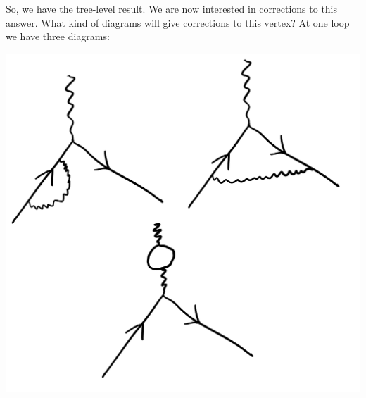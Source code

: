 So, we have the tree-level result. We are now interested in corrections to this answer. What kind of diagrams will give corrections to this vertex? At one loop we have three diagrams:

\begin{center}
    \includegraphics[scale=0.35]{Lectures/Images/lec9-oneloop.png}
\end{center}

